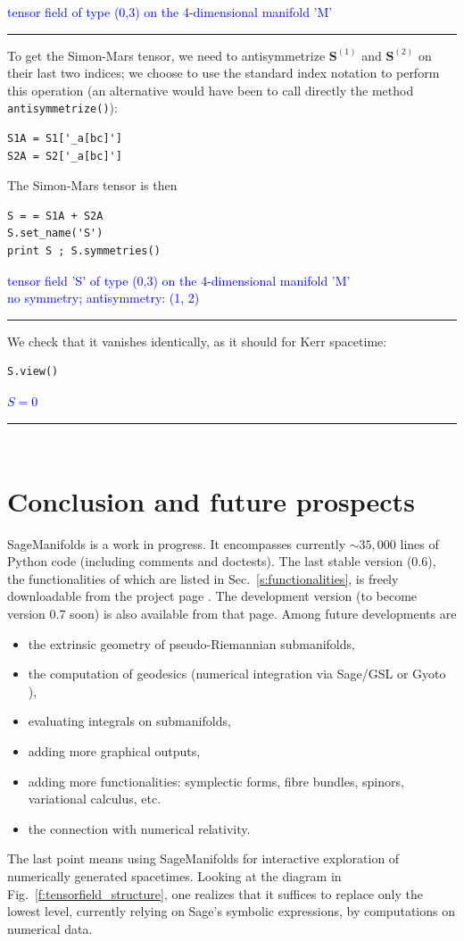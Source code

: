 \documentclass[a4paper]{jpconf}
\newcommand{\soft}[1]{\textsf{#1}}
\newcommand{\code}[1]{\texttt{#1}}
\newcommand{\Sage}{\soft{Sage}}
\newcommand{\SM}{\soft{SageManifolds}}
\newcommand{\w}[1]{\bm{#1}}
\newcommand{\soutput}[1]{\textcolor{blue}{#1}\\[-0.8ex]\rule{\textwidth}{0.4pt}}
\begin{document}
\soutput{tensor field of type (0,3) on the 4-dimensional manifold 'M'}
To get the Simon-Mars tensor, we need to antisymmetrize $\w{S}^{(1)}$ and
$\w{S}^{(2)}$ on their last two indices; we choose to use the standard
index notation to perform this operation (an alternative would have been
to call directly the method \code{antisymmetrize()}):
\begin{verbatim}
S1A = S1['_a[bc]']
S2A = S2['_a[bc]']
\end{verbatim}
The Simon-Mars tensor is then 
\begin{verbatim}
S = = S1A + S2A
S.set_name('S')
print S ; S.symmetries()
\end{verbatim}
\soutput{tensor field 'S' of type (0,3) on the 4-dimensional manifold 'M'\\
no symmetry;  antisymmetry: (1, 2)}
We check that it vanishes identically, as it should for Kerr spacetime:
\begin{verbatim}
S.view()
\end{verbatim}
\soutput{$S=0$}
\begin{verbatim}
\end{verbatim}
\begin{verbatim}
\end{verbatim}




\section{Conclusion and future prospects}

\SM{} is a work in progress. 
It encompasses currently $\sim 35,000$ lines of Python code (including comments and 
doctests). 
The last stable version (0.6), the functionalities of which are 
listed in Sec.~\ref{s:functionalities},
is freely downloadable from the project page
\cite{SM}. The development version (to become version 0.7 soon)
is also available from that page. Among future developments are 
\begin{itemize}
\item the extrinsic geometry of pseudo-Riemannian submanifolds,
\item the computation of geodesics (numerical integration via \soft{Sage/GSL} or 
\soft{Gyoto} \cite{Gyoto}),
\item evaluating integrals on submanifolds,
\item adding more graphical outputs,
\item adding more functionalities: symplectic forms, fibre bundles, 
spinors, variational calculus, etc.
\item the connection with numerical relativity.
\end{itemize}
The last point means using \SM{} for interactive exploration 
of numerically generated spacetimes. Looking at
the diagram in Fig.~\ref{f:tensorfield_structure}, one realizes that it 
suffices to replace only the lowest level, currently relying on
\Sage{}'s symbolic expressions, by computations on numerical data. 
\end{document}
